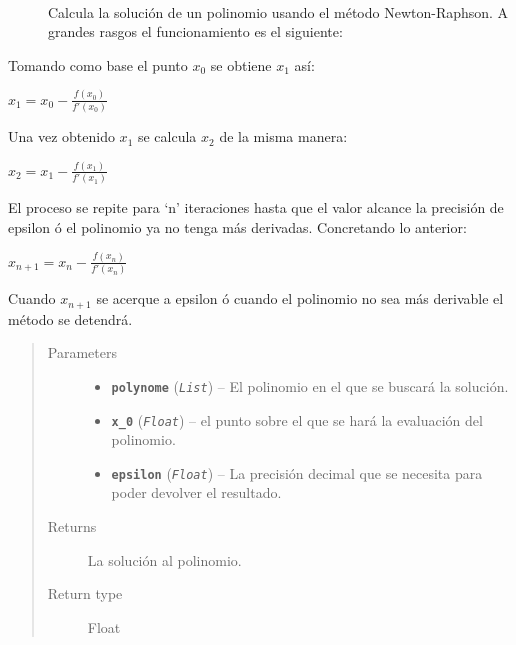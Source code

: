 \documentclass[class=report, crop=false]{standalone}
\begin{document}
\begin{fulllineitems}

~\begin{description}
\item[] Calcula la solución de un polinomio usando el método 
Newton-Raphson.\break
A grandes rasgos el funcionamiento es el siguiente:
\end{description}

Tomando como base el punto \(x_0\) se obtiene \(x_1\) así:

\begin{center}\(x_1 = x_0 - \frac{f(x_0)}{f'(x_0)}\)
\end{center}

Una vez obtenido \(x_1\) se calcula \(x_2\) de la misma manera:

\begin{center}\(x_2 = x_1 - \frac{f(x_1)}{f'(x_1)}\)
\end{center}

El proceso se repite para `n' iteraciones hasta que 
el valor alcance la precisión de epsilon ó el polinomio ya 
no tenga más derivadas. Concretando lo anterior:

\begin{center}\(x_{n+1} = x_n - \frac{f(x_n)}{f'(x_n)}\)
\end{center}

Cuando \(x_{n+1}\) se acerque a epsilon ó cuando el
polinomio no sea más derivable el método se detendrá.

\begin{quote}\begin{description}
\item[{Parameters}] \leavevmode\begin{itemize}
\item \textbf{\texttt{polynome}} (\emph{\texttt{List}}) -- El polinomio en el que se buscará la solución.
\item \textbf{\texttt{x\_0}} (\emph{\texttt{Float}}) -- el punto sobre el que se hará la evaluación del polinomio.
\item \textbf{\texttt{epsilon}} (\emph{\texttt{Float}}) -- La precisión decimal que se necesita para poder devolver
el resultado.
\end{itemize}
\item[{Returns}] \leavevmode
La solución al polinomio.
\item[{Return type}] \leavevmode
Float
\end{description}\end{quote}

\end{fulllineitems}
\end{document}
